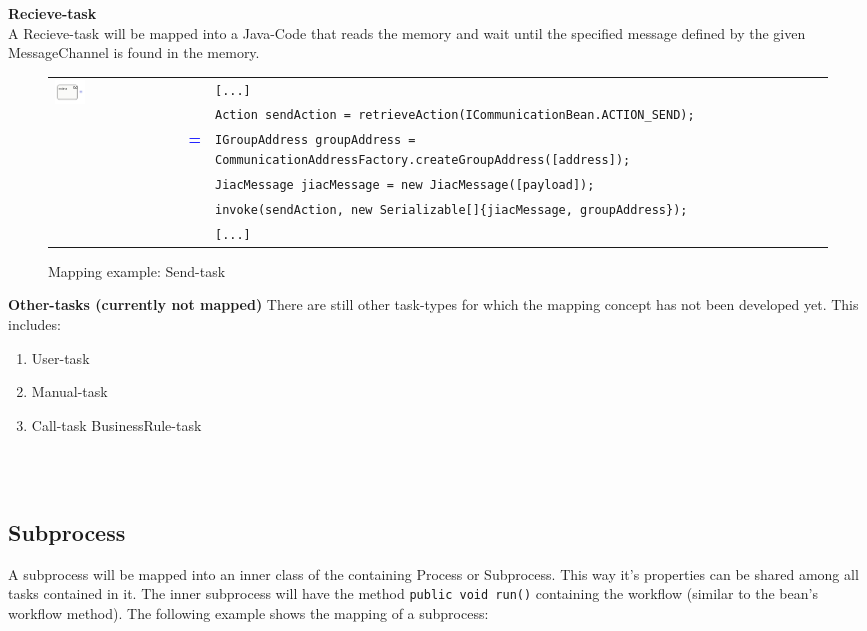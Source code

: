 \textbf{Recieve-task}\\
A Recieve-task will be mapped into a Java-Code that reads the memory and wait until the specified message defined by the given MessageChannel is found in the memory. \\

\begin{figure}[h]
\begin{tabularx}{\linewidth}{lcX}
	\multirow{6}{*}{\includegraphics[width=0.25\textwidth]{images/mapping/recieveTask.png}} & & \texttt{[...]}\\
	& & \texttt{Action sendAction = retrieveAction(ICommunicationBean.ACTION\_SEND);}\\
	& \textbf{\textcolor{blue}{=}} & \texttt{IGroupAddress groupAddress = CommunicationAddressFactory.createGroupAddress([address]);}\\
	& & \texttt{JiacMessage jiacMessage = new JiacMessage([payload]);}\\
	& & \texttt{invoke(sendAction, new Serializable[]\{jiacMessage, groupAddress\});}\\
 & & \texttt{[...]}
\end{tabularx}
\caption{Mapping example: Send-task}%
\label{fig:recieve_task}%
\end{figure}


\textbf{Other-tasks (currently not mapped)}
There are still other task-types for which the mapping concept has not been developed yet. This includes:
\begin{enumerate}
	\item User-task
	\item Manual-task
	\item Call-task
	\iten BusinessRule-task
\end{enumerate}
\\\\

\subsection{Subprocess}
A subprocess will be mapped into an inner class of the containing Process or Subprocess. This way it's properties can be shared among all tasks contained in it. The inner subprocess will have the method \texttt{public void run()} containing the workflow (similar to the bean's workflow method). The following example shows the mapping of a subprocess:\\

